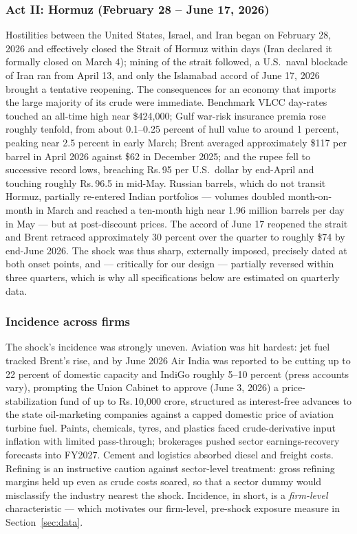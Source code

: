 \documentclass[12pt]{article}
\newcommand{\rupee}{Rs.\,}
\begin{document}
\subsubsection*{Act II: Hormuz (February 28 -- June 17, 2026)}

Hostilities between the United States, Israel, and Iran began on February 28, 2026 and
effectively closed the Strait of Hormuz within days (Iran declared it formally closed on
March 4); mining of the strait followed, a U.S.\ naval blockade of Iran ran from April 13,
and only the Islamabad accord of June 17, 2026 brought a tentative reopening. The
consequences for an economy that imports the large majority of its crude were immediate.
Benchmark VLCC day-rates touched an all-time high near \$424{,}000; Gulf war-risk insurance
premia rose roughly tenfold, from about 0.1--0.25 percent of hull value to around 1 percent,
peaking near 2.5 percent in early March; Brent averaged approximately \$117 per barrel in
April 2026 against \$62 in December 2025; and the rupee fell to successive record lows,
breaching \rupee 95 per U.S.\ dollar by end-April and touching roughly \rupee 96.5 in
mid-May. Russian barrels, which do not transit Hormuz,
partially re-entered Indian portfolios --- volumes doubled month-on-month in March and
reached a ten-month high near 1.96 million barrels per day in May --- but at post-discount
prices. The accord of June 17 reopened the strait and Brent retraced approximately 30
percent over the quarter to roughly \$74 by end-June 2026. The shock was thus sharp,
externally imposed, precisely dated at both onset points, and --- critically for our design
--- partially reversed within three quarters, which is why all specifications below are
estimated on quarterly data.

\subsubsection*{Incidence across firms}

The shock's incidence was strongly uneven. Aviation was hit hardest: jet fuel tracked
Brent's rise, and by June 2026 Air India was reported to be cutting up to 22 percent of
domestic capacity and IndiGo roughly 5--10 percent (press accounts vary), prompting the
Union Cabinet to approve (June 3, 2026) a price-stabilization fund of up to
\rupee 10{,}000 crore, structured as interest-free advances to the state oil-marketing
companies against a capped domestic price of aviation turbine fuel. Paints, chemicals, tyres, and
plastics faced crude-derivative input inflation with limited pass-through; brokerages
pushed sector earnings-recovery forecasts into FY2027. Cement and logistics absorbed
diesel and freight costs. Refining is an instructive caution against sector-level
treatment: gross refining margins held up even as crude costs soared, so that a sector
dummy would misclassify the industry nearest the shock. Incidence, in short, is a
\emph{firm-level} characteristic --- which motivates our firm-level, pre-shock exposure
measure in Section~\ref{sec:data}.
\end{document}
